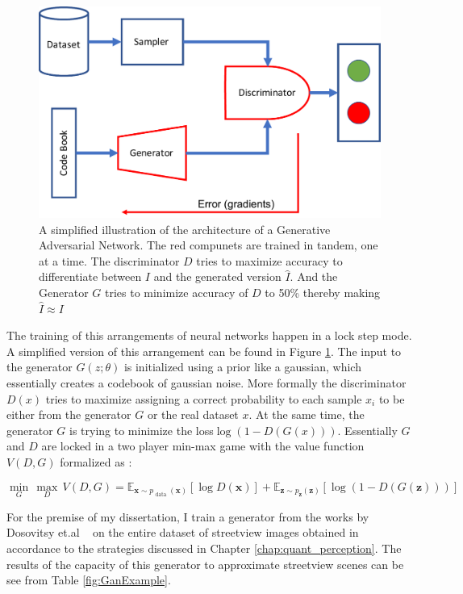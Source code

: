 \begin{figure}[ht!]
    \centering
    \includegraphics[width=0.7\columnwidth]{GAN_arch.pdf}
    \caption{A simplified illustration of the architecture of a Generative Adversarial Network. The red compunets are trained in tandem, one at a time. The discriminator $D$ tries to maximize accuracy to differentiate between $I$ and the generated version $\hat{I}$. And the Generator $G$ tries to minimize accuracy of $D$ to 50\% thereby making $\hat{I}\approx I$}
    \label{fig:GAN_arch}
\end{figure}

The training of this arrangements of neural networks happen in a lock step mode. 
A simplified version of this arrangement can be found in Figure \ref{fig:GAN_arch}.
The input to the generator $G(z;\theta)$ is initialized using a prior like a gaussian, which essentially creates a codebook of gaussian noise. More formally the discriminator $D(x)$ tries to maximize assigning a correct probability to each sample $x_i$ to be either from the generator $G$ or the real dataset $x$. At the same time, the generator $G$ is trying to minimize the loss$\log(1-D(G(x)))$. Essentially $G$ and $D$ are locked in a two player min-max game with the value function $V(D,G)$ formalized as :

\begin{equation}
\min _{G} \, \max _{D} \, V(D, G)=\mathbb{E}_{\boldsymbol{x} \sim p_{\text { data }}(\boldsymbol{x})}[\log D(\boldsymbol{x})]+\mathbb{E}_{\boldsymbol{z} \sim p_{\boldsymbol{z}}(\boldsymbol{z})}[\log (1-D(G(\boldsymbol{z})))]
\end{equation}

For the premise of my dissertation, I train a generator from the works by Dosovitsy et.al ~\cite{dosovitskiy2016generating} on the entire dataset of streetview images obtained in accordance to the strategies discussed in Chapter \ref{chap:quant_perception}. The results of the capacity of this generator to approximate streetview scenes can be see from Table \ref{fig:GanExample}.




